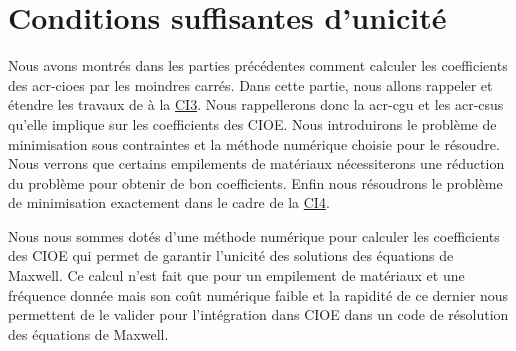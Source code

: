 \chapter{Conditions suffisantes d'unicité}
\minitoc
\newpage
{}
Nous avons montrés dans les parties précédentes comment calculer les coefficients des \glspl{acr-cioe} par les moindres carrés. Dans cette partie, nous allons rappeler et étendre les travaux de \cite{stupfel_sufficient_2011} à la \hyperref[ci3]{CI3}. Nous rappellerons donc la \gls{acr-cgu} et les \glspl{acr-csu} qu'elle implique sur les coefficients des CIOE. Nous introduirons le problème de minimisation sous contraintes et la méthode numérique choisie pour le résoudre. Nous verrons que certains empilements de matériaux nécessiterons une réduction du problème pour obtenir de bon coefficients. Enfin nous résoudrons le problème de minimisation exactement dans le cadre de la \hyperref[ci4]{CI4}.





Nous nous sommes dotés d'une méthode numérique pour calculer les coefficients des CIOE qui permet de garantir l'unicité des solutions des équations de Maxwell. Ce calcul n'est fait que pour un empilement de matériaux et une fréquence donnée mais son coût numérique faible et la rapidité de ce dernier nous permettent de le valider pour l'intégration dans CIOE dans un code de résolution des équations de Maxwell.